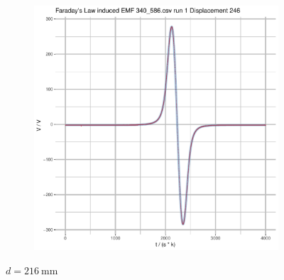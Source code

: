\documentclass[a4paper,11pt]{article}
\begin{document}
\begin{figure}[b]
\begin{subfigure}{.5\textwidth}
\end{subfigure}
\begin{subfigure}{.7\textwidth}
    \centering
    \includegraphics[width=\textwidth,page=18]{Rplots.pdf}
\end{subfigure}
\caption{\(d = \SI{216}{\milli\metre}\)}
\end{figure}
\end{document}
